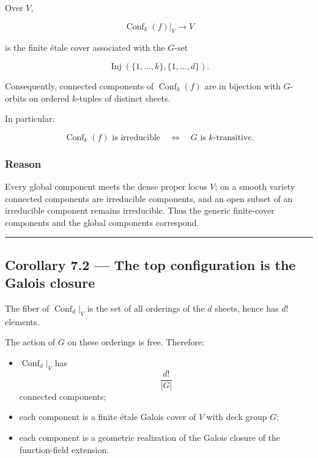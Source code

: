 Over \(V\),

\[
\operatorname{Conf}_k(f)|_V\to V
\]

is the finite étale cover associated with the \(G\)-set

\[
\operatorname{Inj}(\{1,\dots,k\},\{1,\dots,d\}).
\]

Consequently, connected components of \(\operatorname{Conf}_k(f)\) are
in bijection with \(G\)-orbits on ordered \(k\)-tuples of distinct
sheets.

In particular:

\[
\operatorname{Conf}_k(f)\text{ is irreducible}
\quad\Longleftrightarrow\quad
G\text{ is }k\text{-transitive}.
\]

\subsubsection{Reason}\label{reason}

Every global component meets the dense proper locus \(V\); on a smooth
variety connected components are irreducible components, and an open
subset of an irreducible component remains irreducible. Thus the generic
finite-cover components and the global components correspond.

\begin{center}\rule{0.5\linewidth}{0.5pt}\end{center}

\subsection{Corollary 7.2 --- The top configuration is the Galois
closure}\label{corollary-7.2-the-top-configuration-is-the-galois-closure}

The fiber of \(\operatorname{Conf}_d|_V\) is the set of all orderings of
the \(d\) sheets, hence has \(d!\) elements.

The action of \(G\) on these orderings is free. Therefore:

\begin{itemize}
\tightlist
\item
  \(\operatorname{Conf}_d|_V\) has \[
  \frac{d!}{|G|}
  \] connected components;
\item
  each component is a finite étale Galois cover of \(V\) with deck group
  \(G\);
\item
  each component is a geometric realization of the Galois closure of the
  function-field extension.
\end{itemize}

